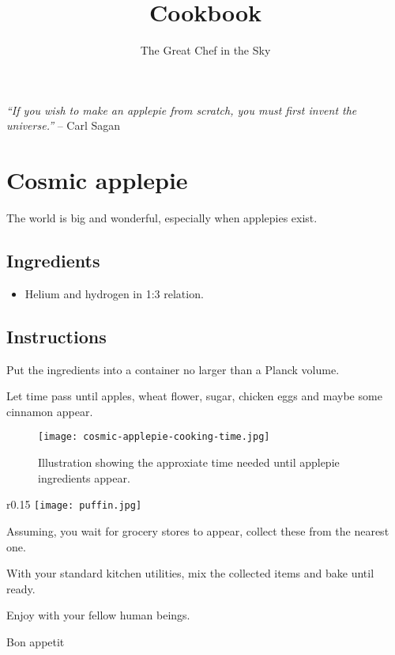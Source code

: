 \documentclass[11pt]{article}
\title{Cookbook}
\author{The Great Chef in the Sky}
\begin{document}
\maketitle

\begin{displayquote}
\emph{``If you wish to make an applepie from scratch, you must first invent the universe.''}
-- Carl Sagan
\end{displayquote}

\section*{Cosmic applepie}

The world is big and wonderful, especially when applepies exist.

\subsection*{Ingredients}

\begin{itemize}
\item Helium and hydrogen in 1:3 relation.
\end{itemize}

\subsection*{Instructions}

Put the ingredients into a container no larger than a Planck volume.

Let time pass until apples, wheat flower, sugar, chicken eggs and maybe some cinnamon appear.

\begin{figure}[h]
\centering
\texttt{[image: cosmic-applepie-cooking-time.jpg]}
\caption{Illustration showing the approxiate time needed until applepie ingredients appear.}
\end{figure}

\begin{wrapfigure}{r}{0.15\textwidth}
    \centering
    \texttt{[image: puffin.jpg]}
\end{wrapfigure}

Assuming, you wait for grocery stores to appear, collect these from the nearest one.

With your standard kitchen utilities, mix the collected items and bake until ready.

Enjoy with your fellow human beings.

Bon appetit
\end{document}
